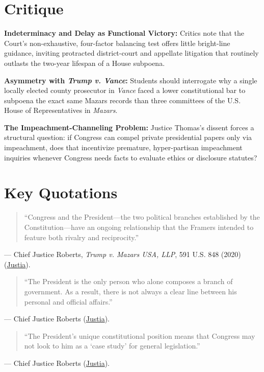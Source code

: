 \documentclass[12pt]{article}
\begin{document}
\section{Critique}
\textbf{Indeterminacy and Delay as Functional Victory:} Critics note that the Court's non-exhaustive, four-factor balancing test offers little bright-line guidance, inviting protracted district-court and appellate litigation that routinely outlasts the two-year lifespan of a House subpoena.

\textbf{Asymmetry with \textit{Trump v. Vance}:} Students should interrogate why a single locally elected county prosecutor in \textit{Vance} faced a lower constitutional bar to subpoena the exact same Mazars records than three committees of the U.S. House of Representatives in \textit{Mazars}.

\textbf{The Impeachment-Channeling Problem:} Justice Thomas's dissent forces a structural question: if Congress can compel private presidential papers only via impeachment, does that incentivize premature, hyper-partisan impeachment inquiries whenever Congress needs facts to evaluate ethics or disclosure statutes?

\section{Key Quotations}
\begin{quote}
``Congress and the President---the two political branches established by the Constitution---have an ongoing relationship that the Framers intended to feature both rivalry and reciprocity.''
\end{quote}
\noindent --- Chief Justice Roberts, \textit{Trump v. Mazars USA, LLP}, 591 U.S. 848 (2020) (\href{https://supreme.justia.com/cases/federal/us/591/19-715/}{Justia}).

\begin{quote}
``The President is the only person who alone composes a branch of government. As a result, there is not always a clear line between his personal and official affairs.''
\end{quote}
\noindent --- Chief Justice Roberts (\href{https://supreme.justia.com/cases/federal/us/591/19-715/}{Justia}).

\begin{quote}
``The President's unique constitutional position means that Congress may not look to him as a `case study' for general legislation.''
\end{quote}
\noindent --- Chief Justice Roberts (\href{https://supreme.justia.com/cases/federal/us/591/19-715/}{Justia}).
\end{document}
